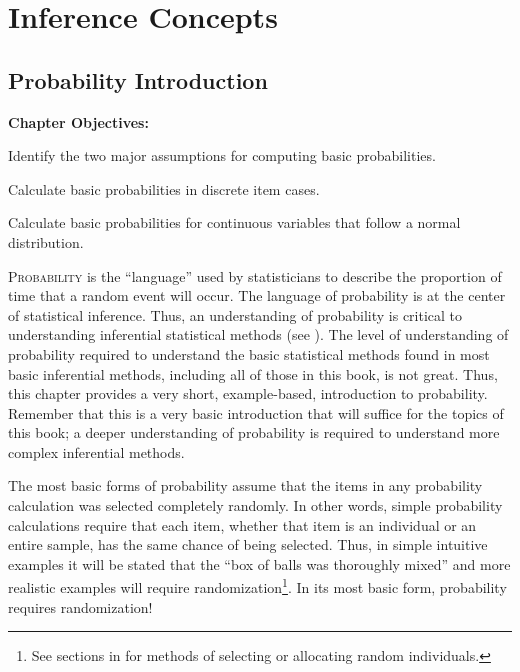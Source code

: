 \documentclass[10pt,openany]{book}\usepackage[]{graphicx}\usepackage[]{color}
\begin{document}
    \part{Inference Concepts}



\chapter{Probability Introduction} \label{chap:ProbIntro}

\begin{ChapObj}{\boxwidth}
  \textbf{Chapter Objectives:}
  \begin{Enumerate}
    \item Identify the two major assumptions for computing basic probabilities.
    \item Calculate basic probabilities in discrete item cases.
    \item Calculate basic probabilities for continuous variables that follow a normal distribution.
  \end{Enumerate}
\end{ChapObj}


\lettrine{P}{robability} is the ``language'' used by statisticians to describe the proportion of time that a random event will occur.  The language of probability is at the center of statistical inference.  Thus, an understanding of probability is critical to understanding inferential statistical methods (see ).  The level of understanding of probability required to understand the basic statistical methods found in most basic inferential methods, including all of those in this book, is not great.  Thus, this chapter provides a very short, example-based, introduction to probability.  Remember that this is a very basic introduction that will suffice for the topics of this book; a deeper understanding of probability is required to understand more complex inferential methods.

The most basic forms of probability assume that the items in any probability calculation was selected completely randomly.  In other words, simple probability calculations require that each item, whether that item is an individual or an entire sample, has the same chance of being selected.  Thus, in simple intuitive examples it will be stated that the ``box of balls was thoroughly mixed'' and more realistic examples will require randomization\footnote{See sections in  for methods of selecting or allocating random individuals.}.  In its most basic form, probability requires randomization!
\end{document}
